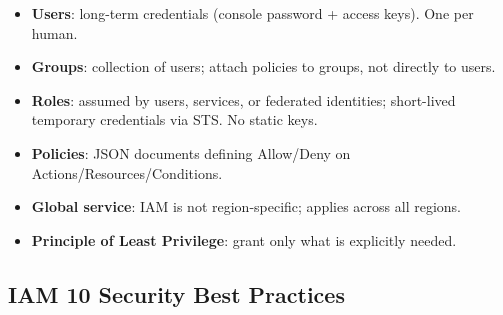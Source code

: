 

\begin{keyfacts}
\begin{itemize}
  \item \textbf{Users}: long-term credentials (console password + access keys). One per human.
  \item \textbf{Groups}: collection of users; attach policies to groups, not directly to users.
  \item \textbf{Roles}: assumed by users, services, or federated identities;
        short-lived temporary credentials via STS. No static keys.
  \item \textbf{Policies}: JSON documents defining Allow/Deny on Actions/Resources/Conditions.
  \item \textbf{Global service}: IAM is not region-specific; applies across all regions.
  \item \textbf{Principle of Least Privilege}: grant only what is explicitly needed.
\end{itemize}
\end{keyfacts}

\subsection{IAM 10 Security Best Practices}


